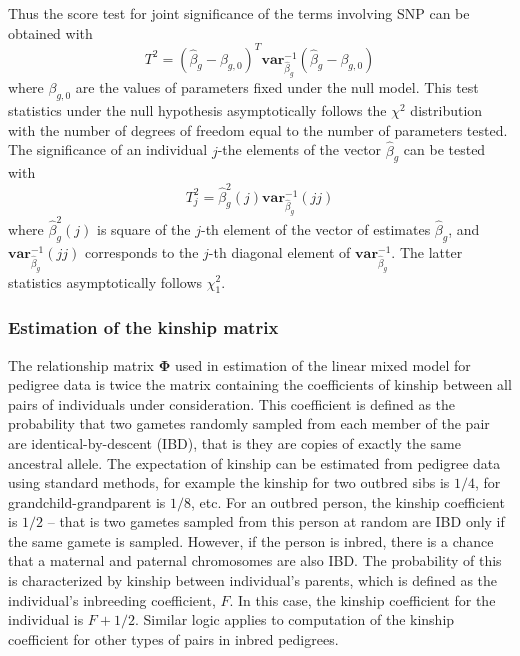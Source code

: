 \documentclass[12pt]{article}
\begin{document}
Thus the score test for joint significance of the terms involving SNP can be obtained with 
$$
T^2 = (\hat{\beta}_g - \beta_{g,0})^T \mathbf{var}_{\hat{\beta}_g}^{-1} (\hat{\beta}_g - \beta_{g,0})
$$
where $\beta_{g,0}$ are the values of parameters fixed under the null model. 
This test statistics under the null hypothesis asymptotically follows the 
$\chi^2$ distribution with the number of degrees 
of freedom equal to the number of parameters tested. 
The significance of an individual $j$-the elements of the vector $\hat{\beta}_g$ can be tested with
$$
T^2_j = \hat{\beta}_{g}^2(j) \mathbf{var}_{\hat{\beta}_g}^{-1}(jj)
$$
where $\hat{\beta}_{g}^2(j)$ is square of the $j$-th element of the vector of estimates $\hat{\beta}_{g}$, 
and $\mathbf{var}_{\hat{\beta}_g}^{-1}(jj)$ corresponds to the $j$-th diagonal element of 
$\mathbf{var}_{\hat{\beta}_g}^{-1}$.
The latter statistics asymptotically follows $\chi^2_1$.

\subsubsection{Estimation of the kinship matrix}
\label{kinship}

The relationship matrix $\mathbf{\Phi}$ used in estimation of the 
linear mixed model for pedigree data is twice the matrix containing 
the coefficients of kinship between all pairs of individuals under consideration. 
This coefficient is defined as the probability that two gametes randomly sampled 
from each member of the pair are identical-by-descent (IBD), that is they are copies 
of exactly the same ancestral allele. The expectation of kinship 
can be estimated from pedigree data using standard methods, for example the 
kinship for two outbred sibs is $1/4$, for grandchild-grandparent is $1/8$, etc.
For an outbred person, the kinship coefficient is $1/2$ -- that is two gametes 
sampled from this person at random are IBD only if the same gamete is 
sampled. However, if the person is inbred, there is a chance that a maternal 
and paternal chromosomes are also IBD. The probability of this is characterized 
by kinship between individual's parents, which is defined as the individual's
inbreeding coefficient, $F$. In this case, the kinship coefficient for the 
individual is $F + 1/2$. Similar logic applies to computation of the kinship 
coefficient for other types of pairs in inbred pedigrees. 
\end{document}
